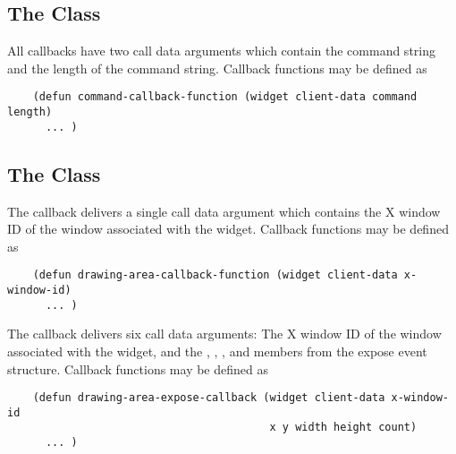 %
%

\subsection{The Class }

All callbacks have two call data arguments which contain the command string
and the length of the command string. Callback functions may be defined as

\begin{verbatim}
    (defun command-callback-function (widget client-data command length)
      ... )
\end{verbatim}

\subsection{The Class }

The  callback delivers a single call data argument which contains
the X window ID of the window associated with the  widget.
Callback functions may be defined as

\begin{verbatim}
    (defun drawing-area-callback-function (widget client-data x-window-id)
      ... )
\end{verbatim}

The  callback delivers six call data arguments: The X window ID of
the window associated with the  widget, and the ,
, ,  and  members from the expose
event structure.  Callback functions may be defined as

\begin{verbatim}
    (defun drawing-area-expose-callback (widget client-data x-window-id
                                         x y width height count)
      ... )
\end{verbatim}

